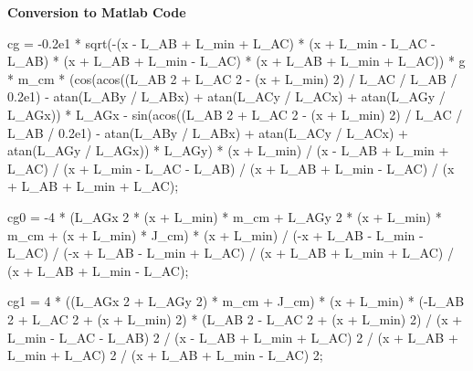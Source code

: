 \documentclass{article}
\begin{document}
\begin{maplegroup}
\begin{mapleinput}
\end{mapleinput}
\end{maplegroup}
\begin{maplegroup}
\begin{Maple Normal}{
\textbf{Conversion to Matlab Code}}\end{Maple Normal}

\end{maplegroup}
\begin{maplegroup}
\begin{mapleinput}
\end{mapleinput}
\mapleresult
cg = -0.2e1 * sqrt(-(x - L\_AB + L\_min + L\_AC) * (x + L\_min - L\_AC - L\_AB) * (x + L\_AB + L\_min - L\_AC) * (x + L\_AB + L\_min + L\_AC)) * g * m\_cm * (cos(acos((L\_AB  2 + L\_AC  2 - (x + L\_min)  2) / L\_AC / L\_AB / 0.2e1) - atan(L\_ABy / L\_ABx) + atan(L\_ACy / L\_ACx) + atan(L\_AGy / L\_AGx)) * L\_AGx - sin(acos((L\_AB  2 + L\_AC  2 - (x + L\_min)  2) / L\_AC / L\_AB / 0.2e1) - atan(L\_ABy / L\_ABx) + atan(L\_ACy / L\_ACx) + atan(L\_AGy / L\_AGx)) * L\_AGy) * (x + L\_min) / (x - L\_AB + L\_min + L\_AC) / (x + L\_min - L\_AC - L\_AB) / (x + L\_AB + L\_min - L\_AC) / (x + L\_AB + L\_min + L\_AC);
\end{maplegroup}
\begin{maplegroup}
\begin{mapleinput}
\end{mapleinput}
\mapleresult
cg0 = -4 * (L\_AGx  2 * (x + L\_min) * m\_cm + L\_AGy  2 * (x + L\_min) * m\_cm + (x + L\_min) * J\_cm) * (x + L\_min) / (-x + L\_AB - L\_min - L\_AC) / (-x + L\_AB - L\_min + L\_AC) / (x + L\_AB + L\_min + L\_AC) / (x + L\_AB + L\_min - L\_AC);
\end{maplegroup}
\begin{maplegroup}
\begin{mapleinput}
\end{mapleinput}
\mapleresult
cg1 = 4 * ((L\_AGx  2 + L\_AGy  2) * m\_cm + J\_cm) * (x + L\_min) * (-L\_AB  2 + L\_AC  2 + (x + L\_min)  2) * (L\_AB  2 - L\_AC  2 + (x + L\_min)  2) / (x + L\_min - L\_AC - L\_AB)  2 / (x - L\_AB + L\_min + L\_AC)  2 / (x + L\_AB + L\_min + L\_AC)  2 / (x + L\_AB + L\_min - L\_AC)  2;
\end{maplegroup}
\begin{maplegroup}
\begin{mapleinput}
\end{mapleinput}
\end{maplegroup}
\begin{Maple Normal}{
\begin{Maple Normal}{
}\end{Maple Normal}
}\end{Maple Normal}
\end{document}
